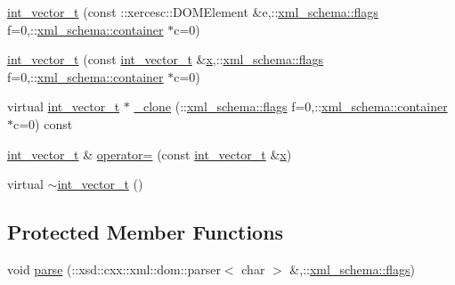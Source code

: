 \begin{DoxyCompactItemize}
\item 
\hyperlink{classint__vector__t_a4c3efd25f1ff338f305182b06ebceff2}{int\+\_\+vector\+\_\+t} (const \+::xercesc\+::\+D\+O\+M\+Element \&e,\+::\hyperlink{namespacexml__schema_a0612287d030cb2732d31a45b258fdc87}{xml\+\_\+schema\+::flags} f=0,\+::\hyperlink{namespacexml__schema_ada9aa30dc722e93ee2ed7243085402a5}{xml\+\_\+schema\+::container} $\ast$c=0)
\item 
\hyperlink{classint__vector__t_a6771bfa76a5b90f1909de20a08b06b9d}{int\+\_\+vector\+\_\+t} (const \hyperlink{classint__vector__t}{int\+\_\+vector\+\_\+t} \&\hyperlink{classint__vector__t_a594dd2055e5fe58eadb41177c23e406b}{x},\+::\hyperlink{namespacexml__schema_a0612287d030cb2732d31a45b258fdc87}{xml\+\_\+schema\+::flags} f=0,\+::\hyperlink{namespacexml__schema_ada9aa30dc722e93ee2ed7243085402a5}{xml\+\_\+schema\+::container} $\ast$c=0)
\item 
virtual \hyperlink{classint__vector__t}{int\+\_\+vector\+\_\+t} $\ast$ \hyperlink{classint__vector__t_a32c2f7c7b895ecd35059948b192538bf}{\+\_\+clone} (\+::\hyperlink{namespacexml__schema_a0612287d030cb2732d31a45b258fdc87}{xml\+\_\+schema\+::flags} f=0,\+::\hyperlink{namespacexml__schema_ada9aa30dc722e93ee2ed7243085402a5}{xml\+\_\+schema\+::container} $\ast$c=0) const 
\item 
\hyperlink{classint__vector__t}{int\+\_\+vector\+\_\+t} \& \hyperlink{classint__vector__t_a2d88328ab01a70176cea852e1c4bc877}{operator=} (const \hyperlink{classint__vector__t}{int\+\_\+vector\+\_\+t} \&\hyperlink{classint__vector__t_a594dd2055e5fe58eadb41177c23e406b}{x})
\item 
virtual \hyperlink{classint__vector__t_ab9f400a26a6d2e170f94972314a7f516}{$\sim$int\+\_\+vector\+\_\+t} ()
\end{DoxyCompactItemize}
\subsection*{Protected Member Functions}
\begin{DoxyCompactItemize}
\item 
void \hyperlink{classint__vector__t_ac351fecb08f5813010ac26d80be81d1b}{parse} (\+::xsd\+::cxx\+::xml\+::dom\+::parser$<$ char $>$ \&,\+::\hyperlink{namespacexml__schema_a0612287d030cb2732d31a45b258fdc87}{xml\+\_\+schema\+::flags})
\end{DoxyCompactItemize}
